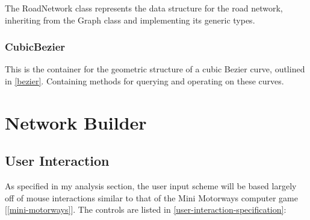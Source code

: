             The RoadNetwork class represents the data structure for the road network, inheriting from the Graph class and implementing its generic types.


        \subsubsection{CubicBezier}

            This is the container for the geometric structure of a cubic Bezier curve, outlined in \autoref{bezier}. Containing methods for querying and operating on these curves.



\section{Network Builder}

    \subsection{User Interaction}

    As specified in my analysis section, the user input scheme will be based largely off of mouse interactions similar to that of the Mini Motorways computer game [\autoref{mini-motorways}]. The controls are listed in \autoref{user-interaction-specification}:

